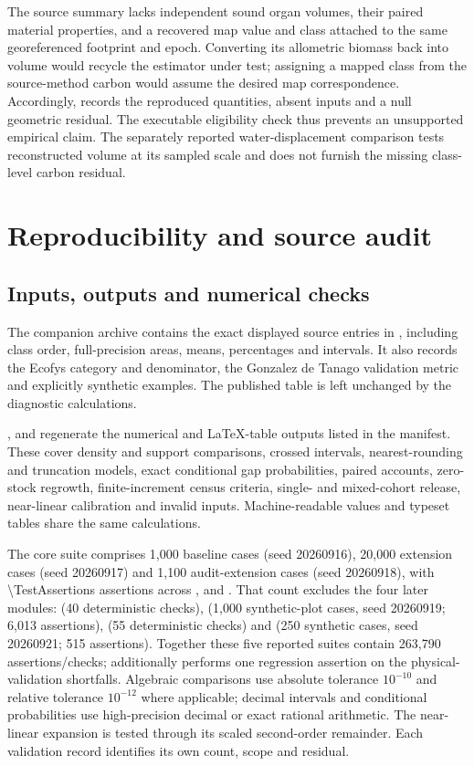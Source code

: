 \documentclass[11pt,a4paper]{article}
\theoremstyle{remark}
\begin{document}
The source summary lacks independent sound organ volumes, their paired material properties, and a recovered map value and class attached to the same georeferenced footprint and epoch. Converting its allometric biomass back into volume would recycle the estimator under test; assigning a mapped class from the source-method carbon would assume the desired map correspondence. Accordingly,  records the reproduced quantities, absent inputs and a null geometric residual. The executable eligibility check thus prevents an unsupported empirical claim. The separately reported water-displacement comparison tests reconstructed volume at its sampled scale and does not furnish the missing class-level carbon residual.

\section{Reproducibility and source audit}
\subsection{Inputs, outputs and numerical checks}
The companion archive contains the exact displayed source entries in , including class order, full-precision areas, means, percentages and intervals. It also records the Ecofys category and denominator, the Gonzalez de Tanago validation metric and explicitly synthetic examples. The published table is left unchanged by the diagnostic calculations.

,  and  regenerate the numerical and LaTeX-table outputs listed in the manifest. These cover density and support comparisons, crossed intervals, nearest-rounding and truncation models, exact conditional gap probabilities, paired accounts, zero-stock regrowth, finite-increment census criteria, single- and mixed-cohort release, near-linear calibration and invalid inputs. Machine-readable values and typeset tables share the same calculations.

The core suite comprises 1,000 baseline cases (seed 20260916), 20,000 extension cases (seed 20260917) and 1,100 audit-extension cases (seed 20260918), with \num{\TestAssertions} assertions across ,  and . That count excludes the four later modules:  (40 deterministic checks),  (1,000 synthetic-plot cases, seed 20260919; 6,013 assertions),  (55 deterministic checks) and  (250 synthetic cases, seed 20260921; 515 assertions). Together these five reported suites contain 263,790 assertions/checks;  additionally performs one regression assertion on the physical-validation shortfalls. Algebraic comparisons use absolute tolerance $10^{-10}$ and relative tolerance $10^{-12}$ where applicable; decimal intervals and conditional probabilities use high-precision decimal or exact rational arithmetic. The near-linear expansion is tested through its scaled second-order remainder. Each validation record identifies its own count, scope and residual.
\end{document}
